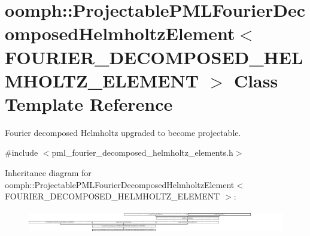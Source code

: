 \hypertarget{classoomph_1_1ProjectablePMLFourierDecomposedHelmholtzElement}{}\section{oomph\+:\+:Projectable\+P\+M\+L\+Fourier\+Decomposed\+Helmholtz\+Element$<$ F\+O\+U\+R\+I\+E\+R\+\_\+\+D\+E\+C\+O\+M\+P\+O\+S\+E\+D\+\_\+\+H\+E\+L\+M\+H\+O\+L\+T\+Z\+\_\+\+E\+L\+E\+M\+E\+NT $>$ Class Template Reference}
\label{classoomph_1_1ProjectablePMLFourierDecomposedHelmholtzElement}


Fourier decomposed Helmholtz upgraded to become projectable.  




{\ttfamily \#include $<$pml\+\_\+fourier\+\_\+decomposed\+\_\+helmholtz\+\_\+elements.\+h$>$}

Inheritance diagram for oomph\+:\+:Projectable\+P\+M\+L\+Fourier\+Decomposed\+Helmholtz\+Element$<$ F\+O\+U\+R\+I\+E\+R\+\_\+\+D\+E\+C\+O\+M\+P\+O\+S\+E\+D\+\_\+\+H\+E\+L\+M\+H\+O\+L\+T\+Z\+\_\+\+E\+L\+E\+M\+E\+NT $>$\+:\begin{figure}[H]
\begin{center}
\leavevmode
\includegraphics[height=1.015965cm]{classoomph_1_1ProjectablePMLFourierDecomposedHelmholtzElement}
\end{center}
\end{figure}
